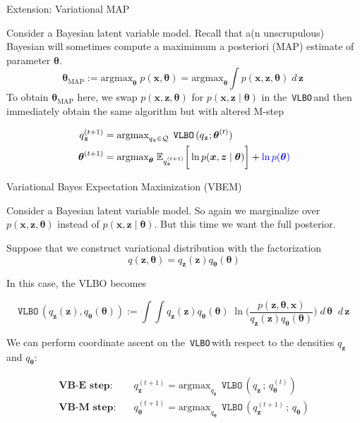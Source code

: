 \documentclass[10pt]{beamer}
\newcommand{\ds}{\displaystyle}
\newcommand{\df}{\displaystyle\frac}
\newcommand{\+}[1]{\ensuremath{{\boldsymbol #1}}} %
\newcommand{\cond}{\; | \;}
\newcommand{\blue}[1]{\color{blue}{#1}  \color{black}}
\newcommand{\E}{\mathbb{E}}
\newcommand{\KL}[2] {\texttt{KL} \big({#1} \; \big|\big| \; {#2} \big)}
\newcommand{\wrt}[1]{\; d \,{#1} \;}
\newcommand{\VLBO}{\,\texttt{VLBO}\,}
\begin{document}
\begin{frame}{Extension: Variational MAP}

Consider a \alert{Bayesian latent variable model}. Recall that a(n unscrupulous) Bayesian will sometimes compute a maximimum a posteriori (MAP) estimate of parameter $\+\theta$.  
\begin{equation}
\+\theta_{\text{MAP}}:=  \text{argmax}_{\+\theta} \; p (\+x , \+\theta) = \text{argmax}_{\+\theta} \ds\int p(\+x,\+z , \+\theta) \wrt{\+z} 
\label{map_latent_vars}
\end{equation} To obtain $\+\theta_{\text{MAP}}$ here, we swap $p(\+x,\+z, \+\theta)$ for $p(\+x,\+z \cond \+\theta)$ in the \VLBO and then immediately obtain the same algorithm but with altered M-step 

\begin{align*}
q_{\+z}^{(t+1)} &= \text{argmax}_{q_\+z \in \mathcal{Q}} \; \VLBO  (q_\+z ; \+\theta^{(t)} )\label{ve_update} \\ 
\+\theta^{(t+1)} &= \text{argmax}_{\+\theta} \; \E_{q_{\+z}^{(t+1)}} \bigg[ \ln p(\+x, \+z \cond \+\theta) \bigg] + \blue{\ln p(\+\theta)} 
\end{align*} 

\end{frame}


\begin{frame}{Variational Bayes Expectation Maximization (VBEM)}

Consider a \alert{Bayesian latent variable model}.  So again we marginalize over $p(\+x, \+z, \+\theta)$ instead of $p(\+x, \+z \cond \+\theta)$. But this time we want the full posterior. 

 

Suppose that we construct variational distribution with the factorization  
\[  q(\+z,\+\theta)=q_\+z(\+z) q_{\+\theta}(\+\theta)\]

 

In this case, the VLBO becomes

\begin{equation}
\VLBO (q_\+z(\+z), q_\+\theta(\+\theta)):=  \ds\int \ds\int  q_\+z(\+z) q_\+\theta(\+\theta) \; \ln \bigg( \df{p(\+z, \+\theta, \+x)}{q_\+z(\+z) q_\+\theta(\+\theta)} \bigg) \wrt{\+\theta} \wrt{\+z}  \label{VLBO_bayesian_latent}
\end{equation}

 
We can perform coordinate ascent on the \VLBO with respect to the densities $q_\+z$ and $q_{\+\theta}$: 

\begin{align*}
\textbf{VB-E step}: \quad & q_{\+z}^{(t+1)} = \text{argmax}_{q_\+z} \; \VLBO (q_\+z \, ; \, q_{\+\theta}^{(t)} )  \\
\textbf{VB-M step}: \quad & q_{\+\theta}^{(t+1)} = \text{argmax}_{q_{\+\theta}} \;  \VLBO (q_{\+z}^{(t+1)}  \, ; \, q_{\+\theta}) \\
\end{align*} 

\end{frame}
\end{document}
